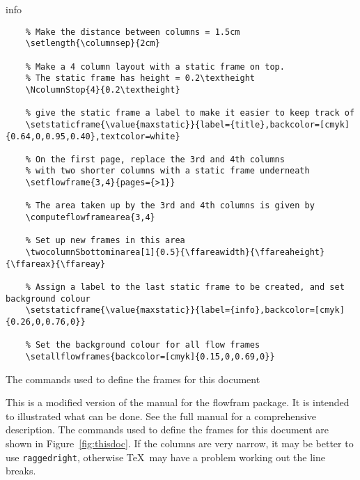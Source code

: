 \documentclass[a0]{a0poster}
\newcommand{\sty}[1]{\textsf{#1}}
\newcommand{\cmdname}[1]{\texttt{\symbol{92}#1}}
\begin{document}

\pagestyle{empty}

\begin{staticcontents*}{info}
\begin{staticfigure}

\begin{verbatim}
    % Make the distance between columns = 1.5cm
    \setlength{\columnsep}{2cm}

    % Make a 4 column layout with a static frame on top.
    % The static frame has height = 0.2\textheight
    \NcolumnStop{4}{0.2\textheight}

    % give the static frame a label to make it easier to keep track of
    \setstaticframe{\value{maxstatic}}{label={title},backcolor=[cmyk]{0.64,0,0.95,0.40},textcolor=white}

    % On the first page, replace the 3rd and 4th columns
    % with two shorter columns with a static frame underneath
    \setflowframe{3,4}{pages={>1}}

    % The area taken up by the 3rd and 4th columns is given by
    \computeflowframearea{3,4}
    
    % Set up new frames in this area
    \twocolumnSbottominarea[1]{0.5}{\ffareawidth}{\ffareaheight}{\ffareax}{\ffareay}

    % Assign a label to the last static frame to be created, and set background colour
    \setstaticframe{\value{maxstatic}}{label={info},backcolor=[cmyk]{0.26,0,0.76,0}}

    % Set the background colour for all flow frames
    \setallflowframes{backcolor=[cmyk]{0.15,0,0.69,0}}
\end{verbatim}

\caption{The commands used to define the frames for this document}
\protect\label{fig:thisdoc}
\end{staticfigure}
\end{staticcontents*}

This is a modified version of the manual for the \sty{flowfram} package.
It is intended to illustrated what can be done. See the full manual for
a comprehensive description. The commands used to define the frames for
this document are shown in Figure~\ref{fig:thisdoc}.
If the columns are very narrow, it may be better to
use \cmdname{raggedright}, otherwise \TeX\ may have a
problem working out the line breaks.
\end{document}

